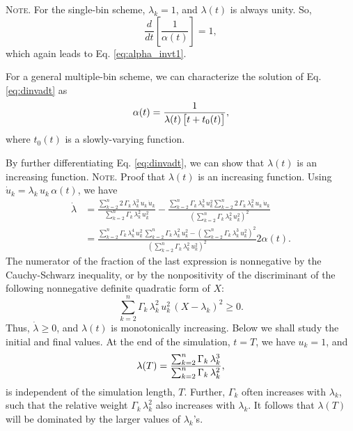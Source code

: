 \documentclass[preprint, floatfix]{revtex4-1}
\newcommand{\note}[1]{{\color{DarkGreen}\footnotesize \textsc{Note.} #1}}
\begin{document}
\note{For the single-bin scheme, $\lambda_k = 1$,
and $\lambda(t)$ is always unity.
%
So,
$$
\frac { d   }
      { d t }
\left[
  \frac{      1    }
       { \alpha(t) }
\right]
=
1,
$$
which again leads to Eq. \eqref{eq:alpha_invt1}.


For a general multiple-bin scheme,
we can characterize the solution of
Eq. \eqref{eq:dinvadt} as
\begin{equation}
  \alpha(t)
  =
  \frac{                  1                     }
       { \lambda(t) \, \bigl[ t + t_0(t) \bigr] }
  ,
\notag
\end{equation}
%
where
$t_0(t)$ is a slowly-varying function.
}


By further differentiating Eq. \eqref{eq:dinvadt},
we can show that $\lambda(t)$
is an increasing function.
%
\note{Proof that $\lambda(t)$ is an increasing function.
  Using $\dot u_k = \lambda_k \, u_k \, \alpha(t)$,
  we have
  $$
  \begin{aligned}
    \dot \lambda
    &=
    \frac
    {
      \sum_{k = 2}^n 2 \, \Gamma_k \, \lambda_k^3 \, u_k \, \dot u_k
    }
    {
      \sum_{k = 2}^n \Gamma_k \, \lambda_k^2 \, u_k^2
    }
    -
    \frac
    {
      \sum_{k = 2}^n \Gamma_k \, \lambda_k^3 \, u_k^2
      \sum_{k = 2}^n 2 \, \Gamma_k \, \lambda_k^2 \, u_k \, \dot u_k
    }
    {
      \left(
        \sum_{k = 2}^n \Gamma_k \, \lambda_k^2 \, u_k^2
      \right)^2
    }
    \\
    &=
    \frac
    {
      \sum_{k = 2}^n \Gamma_k \, \lambda_k^4 \, u_k^2
      \,
      \sum_{k = 2}^n \Gamma_k \, \lambda_k^2 \, u_k^2
      -
      \left(
        \sum_{k = 2}^n \Gamma_k \, \lambda_k^3 \, u_k^2
      \right)^2
    }
    {
      \left(
        \sum_{k = 2}^n \Gamma_k \, \lambda_k^2 \, u_k^2
      \right)^2
    }
    2 \alpha(t).
  \end{aligned}
  $$
  The numerator of the fraction of the last expression
  is nonnegative by the Cauchy-Schwarz inequality,
  or by the nonpositivity of the discriminant
  of the following nonnegative definite quadratic form of $X$:
  $$
  \sum_{k = 2}^n \Gamma_k \, \lambda_k^2 \, u_k^2 \, (X - \lambda_k)^2 \ge 0.
  $$
  Thus, $\dot \lambda \ge 0$, and $\lambda(t)$ is monotonically increasing.
}%
%
Below we shall study the initial and final values.
%
At the end of the simulation,
$t = T$, we have $u_k = 1$, and
%
\begin{equation}
  \lambda(T)
  =
  \frac{
    \sum_{ k = 2 }^n
      \Gamma_k \, \lambda_k^3
  }
  {
    \sum_{ k = 2 }^n
      \Gamma_k \, \lambda_k^2
  }
  ,
\notag
\end{equation}
is independent of the simulation length, $T$.
%
Further, $\Gamma_k$ often increases with $\lambda_k$,
such that the relative weight $\Gamma_k \, \lambda_k^2$
also increases with $\lambda_k$.
%
It follows that $\lambda(T)$ will be dominated
by the larger values of $\lambda_k$'s.
\end{document}
